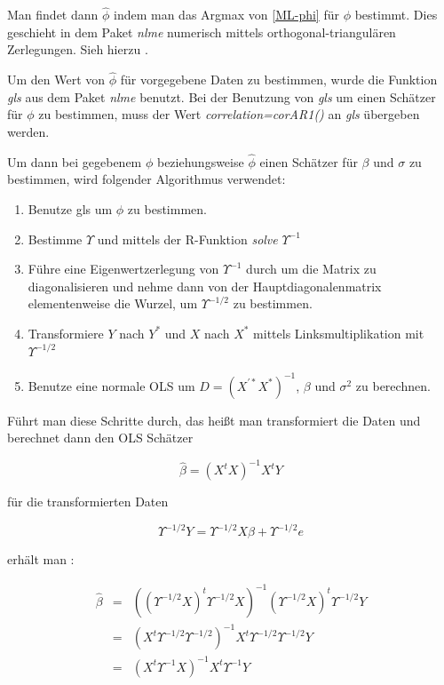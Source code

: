 \documentclass[12pt,a4paper]{article}
\theoremstyle{definition}
\theoremstyle{definition}
\theoremstyle{definition}
\theoremstyle{definition}
\begin{document}
Man findet dann $\hat{\phi}$ indem man das Argmax von \eqref{ML-phi} für $\phi$ bestimmt. Dies geschieht in dem Paket \textit{nlme} numerisch mittels orthogonal-triangulären Zerlegungen. Sieh hierzu \cite[68-75]{Pinheiro00}.

Um den Wert von $\hat{\phi}$ für vorgegebene Daten zu bestimmen, wurde die Funktion \textit{gls} aus dem Paket \textit{nlme} benutzt. Bei der Benutzung von \textit{gls} um einen Schätzer für $\phi$ zu bestimmen, muss der Wert \textit{correlation=corAR1()} an \textit{gls} übergeben werden.

Um dann bei gegebenem $\phi$ beziehungsweise $\hat{\phi}$ einen Schätzer für $\beta$ und $\sigma$ zu bestimmen, wird folgender Algorithmus verwendet:

\begin{enumerate}
\item Benutze gls um $\phi$ zu bestimmen.
\item Bestimme $\Upsilon$ und mittels der R-Funktion \textit{solve} $\Upsilon^{-1}$ 
\item Führe eine Eigenwertzerlegung von $\Upsilon^{-1}$ durch um die Matrix zu diagonalisieren und nehme dann von der Hauptdiagonalenmatrix elementenweise die Wurzel, um $\Upsilon^{-1/2}$ zu bestimmen.
\item Transformiere $Y$ nach $Y^{*}$ und $X$ nach $X^{*}$ mittels Linksmultiplikation mit $\Upsilon^{-1/2}$
\item Benutze eine normale OLS um $D=(X^{'*}X^{*})^{-1}$, $\beta$ und $\sigma^2$ zu berechnen.
\end{enumerate}

Führt man diese Schritte durch, das heißt man transformiert die Daten und berechnet dann den OLS Schätzer 

\begin{equation*}
\hat{\beta} = (X^{t} X)^{-1} X^{t} Y
\end{equation*}

für die transformierten Daten 

\begin{equation*}
\Upsilon^{-1/2} Y = \Upsilon^{-1/2} X \beta + \Upsilon^{-1/2} e
\end{equation*}

erhält man :

\begin{eqnarray*}
\hat{\beta} &=& ((\Upsilon^{-1/2} X)^{t} \Upsilon^{-1/2} X)^{-1} (\Upsilon^{-1/2} X)^{t} \Upsilon^{-1/2} Y \\
&=& (X^{t} \Upsilon^{-1/2} \Upsilon^{-1/2})^{-1} X^{t} \Upsilon^{-1/2} \Upsilon^{-1/2} Y \\
&=& (X^{t} \Upsilon^{-1} X)^{-1} X^{t} \Upsilon^{-1} Y
\end{eqnarray*}
 
\end{document}

